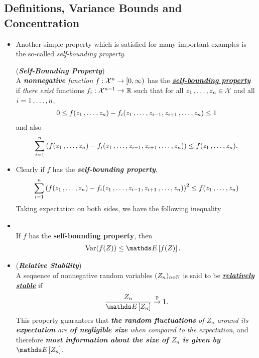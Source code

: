 \documentclass[11pt]{article}
\begin{document}
\subsection{Definitions, Variance Bounds and Concentration}
\begin{itemize}
\item Another simple property which is satisfied for many important examples is the so-called \emph{self-bounding property}. 
\begin{definition} (\emph{\textbf{Self-Bounding Property}})\\
A \emph{\textbf{nonnegative} function} $f: {\mathcal X}^n  \to [0, \infty)$ has the \underline{\emph{\textbf{self-bounding property}}} if \emph{there exist} functions $f_i: {\mathcal X}^{n-1} \to {\mathbb R}$ such that for all $z_1 \,{,}\ldots{,}\, z_n \in {\mathcal X}$ and all $i = 1 \,{,}\ldots{,}\, n$,
\begin{align}
0 \le  f(z_1 \,{,}\ldots{,}\, z_n) - f_i(z_1 \,{,}\ldots{,}\, z_{i-1}, z_{i+1} \,{,}\ldots{,}\, z_n) \le 1 \label{eqn: self_bounding_1}
\end{align}
and also
\begin{align}
\sum_{i=1}^{n}\left(f(z_1 \,{,}\ldots{,}\, z_n) - f_i(z_1 \,{,}\ldots{,}\, z_{i-1}, z_{i+1} \,{,}\ldots{,}\, z_n)\right)  \le  f(z_1 \,{,}\ldots{,}\, z_n). \label{eqn: self_bounding_2}
\end{align}
\end{definition}

\item \begin{remark}
Clearly if $f$ has the \textbf{\emph{self-bounding property}}, 
\begin{align}
\sum_{i=1}^{n}\left(f(z_1 \,{,}\ldots{,}\, z_n) - f_i(z_1 \,{,}\ldots{,}\, z_{i-1}, z_{i+1} \,{,}\ldots{,}\, z_n)\right)^2  \le  f(z_1 \,{,}\ldots{,}\, z_n) \label{eqn: self_bounding_3}
\end{align} Taking expectation on both sides, we have the following inequality
\end{remark}

\item \begin{corollary} \citep{boucheron2013concentration}\\
If $f$ has the \textbf{self-bounding property}, then
\begin{align*}
\text{Var}(f(Z)) &\le \E{}{f(Z)}.
\end{align*}
\end{corollary}

\item \begin{remark} (\emph{\textbf{Relative Stability}}) \citep{boucheron2013concentration}\\
A sequence of nonnegative random variables $(Z_n)_{n\in {\mathbb N}}$ is said to be \underline{\emph{\textbf{relatively stable}}} if 
\begin{align*}
\frac{Z_n}{\E{}{Z_n}} \stackrel{\bP}{\rightarrow} 1.
\end{align*}
This property guarantees that \emph{\textbf{the random fluctuations} of $Z_n$ around its \textbf{expectation} are \textbf{of negligible size} when compared to the expectation}, and therefore \emph{\textbf{most information about the size of $Z_n$ is given by $\E{}{Z_n}$}}. 


\end{remark}
\end{itemize}
\end{document}
